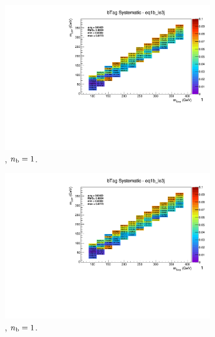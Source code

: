 \begin{figure}[ht!]
\begin{subfigure}[b]{0.32\textwidth}
    \includegraphics[width=\textwidth, page=8]{Figs/sms/t2degen/v19/systs/T2_4body_bTag_eq1b_le3j.pdf}
    \caption{\njlow, $n_{\text{b}} = 1$.}
  \end{subfigure}
  \begin{subfigure}[b]{0.32\textwidth}
    \includegraphics[width=\textwidth, page=1]{Figs/sms/t2degen/v19/systs/T2_4body_bTag_eq1b_le3j.pdf}
    \caption{\njlow, $n_{\text{b}} = 1$.}
  \end{subfigure}\\
  \begin{subfigure}[b]{0.32\textwidth}

\end{subfigure}
\end{figure}
